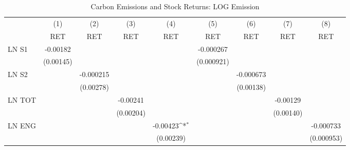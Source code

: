 \begin{table}[htbp]\centering
\def\sym#1{\ifmmode^{#1}\else\(^{#1}\)\fi}
\caption{Carbon Emissions and Stock Returns: LOG Emission}
\begin{tabular}{l*{8}{c}}
\hline\hline
                    &\multicolumn{1}{c}{(1)}&\multicolumn{1}{c}{(2)}&\multicolumn{1}{c}{(3)}&\multicolumn{1}{c}{(4)}&\multicolumn{1}{c}{(5)}&\multicolumn{1}{c}{(6)}&\multicolumn{1}{c}{(7)}&\multicolumn{1}{c}{(8)}\\
                    &\multicolumn{1}{c}{RET}&\multicolumn{1}{c}{RET}&\multicolumn{1}{c}{RET}&\multicolumn{1}{c}{RET}&\multicolumn{1}{c}{RET}&\multicolumn{1}{c}{RET}&\multicolumn{1}{c}{RET}&\multicolumn{1}{c}{RET}\\
\hline
LN S1               &    -0.00182         &                     &                     &                     &   -0.000267         &                     &                     &                     \\
                    &   (0.00145)         &                     &                     &                     &  (0.000921)         &                     &                     &                     \\
LN S2               &                     &   -0.000215         &                     &                     &                     &   -0.000673         &                     &                     \\
                    &                     &   (0.00278)         &                     &                     &                     &   (0.00138)         &                     &                     \\
LN TOT              &                     &                     &    -0.00241         &                     &                     &                     &    -0.00129         &                     \\
                    &                     &                     &   (0.00204)         &                     &                     &                     &   (0.00140)         &                     \\
LN ENG              &                     &                     &                     &    -0.00423\sym{*}  &                     &                     &                     &   -0.000733         \\
                    &                     &                     &                     &   (0.00239)         &                     &                     &                     &  (0.000953)         \\

\end{tabular}
\end{table}
